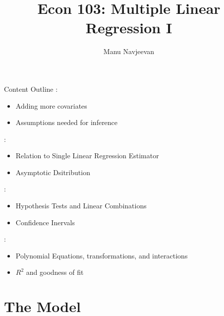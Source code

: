 \documentclass[notheorems,9pt]{beamer}
\title{Econ 103: Multiple Linear Regression I}
\author{Manu Navjeevan}
\institute{UCLA}
\begin{document}
\frame{\titlepage}

\begin{frame}{Content Outline} 
	\label{frame:content-outline}
	:
	\begin{itemize}
		\item Adding more covariates
		\item Assumptions needed for inference
	\end{itemize}
	:
	\begin{itemize}
		\item Relation to Single Linear Regression Estimator
		\item Asymptotic Dsitribution
	\end{itemize}
	:
	\begin{itemize}
		\item Hypothesis Tests and Linear Combinations
		\item Confidence Inervals
	\end{itemize}
	:
	\begin{itemize}
		\item Polynomial Equations, transformations, and interactions
		\item \(R^2\) and goodness of fit
	\end{itemize}
\end{frame}
\section{The Model}
\end{document}
